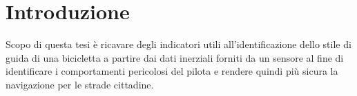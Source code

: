 \documentclass[class=article]{standalone}
\begin{document}
	\section{Introduzione}
	Scopo di questa tesi è ricavare degli indicatori utili all'identificazione dello stile di guida di una bicicletta a partire dai dati inerziali forniti da un sensore al fine di identificare i comportamenti pericolosi del pilota e rendere quindi più sicura la navigazione per le strade cittadine.
\end{document}
